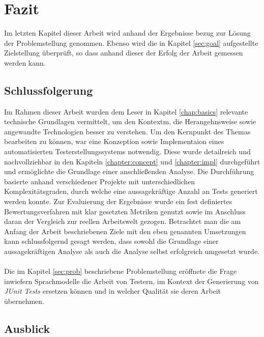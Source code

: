 \chapter{Fazit}
Im letzten Kapitel dieser Arbeit wird anhand der Ergebnisse bezug zur Lösung der Problemstellung genommen. Ebenso wird die in Kapitel \ref{sec:goal} aufgestellte Zielstellung überprüft, so dass anhand dieser der Erfolg der Arbeit gemessen werden kann.

\section{Schlussfolgerung}
Im Rahmen dieser Arbeit wurden dem Leser in Kapitel \ref{chap:basics} relevante technische Grundlagen vermittelt, um den Kontextm, die Herangehnsweise sowie angewandte Technologien besser zu verstehen. Um den Kernpunkt des Themas bearbeiten zu können, war eine Konzeption sowie Implementaion eines automatisierten Testerstellungssystems notwendig. Diese wurde detailreich und nachvollziehbar in den Kapiteln \ref{chapter:concept} und \ref{chapter:impl} durchgeführt und ermöglichte die Grundlage einer anschließenden Analyse. Die Durchführung basierte anhand verschiedener Projekte mit unterschiedlichen Komplexitätsgraden, durch welche eine aussagekräftige Anzahl an Tests generiert werden konnte. Zur Evaluierung der Ergebnisse wurde ein fest definiertes Bewertungsverfahren mit klar gesetzten Metriken genutzt sowie im Anschluss daran der Vergleich zur reellen Arbeitswelt gezogen. Betrachtet man die am Anfang der Arbeit beschriebenen Ziele mit den eben genannten Umsetzungen kann schlussfolgernd gesagt werden, dass sowohl die Grundlage einer aussagekräftigen Analyse als auch die Analyse selbst erfolgreich umgesetzt wurde.\\\\
Die im Kapitel \ref{sec:prob} beschriebene Problemstellung eröffnete die Frage inwiefern Sprachmodelle die Arbeit von Testern, im Kontext der Generierung von \textit{JUnit Tests} ersetzen können und in welcher Qualität sie deren Arbeit übernehmen.
\section{Ausblick}